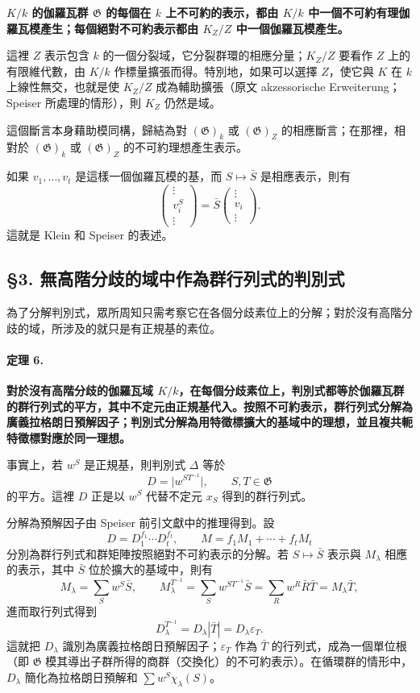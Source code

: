 \documentclass[11pt]{article}
\newcommand{\Gg}{\mathfrak G}
\newcommand{\srcemph}[1]{\textbf{#1}}
\begin{document}
\srcemph{\(K/k\) 的伽羅瓦群 \(\Gg\) 的每個在 \(k\) 上不可約的表示，都由 \(K/k\) 中一個不可約有理伽羅瓦模產生；每個絕對不可約表示都由 \(K_Z/Z\) 中一個伽羅瓦模產生。}

這裡 \(Z\) 表示包含 \(k\) 的一個分裂域，它分裂群環的相應分量；\(K_Z/Z\) 要看作 \(Z\) 上的有限維代數，由 \(K/k\) 作標量擴張而得。特別地，如果可以選擇 \(Z\)，使它與 \(K\) 在 \(k\) 上線性無交，也就是使 \(K_Z/Z\) 成為輔助擴張（原文 akzessorische Erweiterung；Speiser 所處理的情形），則 \(K_Z\) 仍然是域。

這個斷言本身藉助模同構，歸結為對 \((\Gg)_k\) 或 \((\Gg)_Z\) 的相應斷言；在那裡，相對於 \((\Gg)_k\) 或 \((\Gg)_Z\) 的不可約理想產生表示。

如果 \(v_1,\ldots,v_t\) 是這樣一個伽羅瓦模的基，而 \(S\mapsto \bar S\) 是相應表示，則有
\[
        \begin{pmatrix}\vdots\\ v_i^S\\ \vdots\end{pmatrix}
        =\bar S\begin{pmatrix}\vdots\\ v_i\\ \vdots\end{pmatrix}.
\]
這就是 Klein 和 Speiser 的表述。

\subsection*{§3. 無高階分歧的域中作為群行列式的判別式}

為了分解判別式，眾所周知只需考察它在各個分歧素位上的分解；對於沒有高階分歧的域，所涉及的就只是有正規基的素位。

\paragraph{定理 6.}
\srcemph{對於沒有高階分歧的伽羅瓦域 \(K/k\)，在每個分歧素位上，判別式都等於伽羅瓦群的群行列式的平方，其中不定元由正規基代入。按照不可約表示，群行列式分解為廣義拉格朗日預解因子；判別式分解為用特徵標擴大的基域中的理想，並且複共軛特徵標對應於同一理想。}

事實上，若 \(w^S\) 是正規基，則判別式 \(\Delta\) 等於
\[
        D=\bigl|w^{ST^{-1}}\bigr|,\qquad S,T\in\Gg
\]
的平方。這裡 \(D\) 正是以 \(w^S\) 代替不定元 \(x_S\) 得到的群行列式。

分解為預解因子由 Speiser 前引文獻中的推理得到。設
\[
        D=D_1^{f_1}\cdots D_t^{f_t},
        \qquad
        M=f_1M_1+\cdots+f_tM_t
\]
分別為群行列式和群矩陣按照絕對不可約表示的分解。若 \(S\mapsto\bar S\) 表示與 \(M_\lambda\) 相應的表示，其中 \(\bar S\) 位於擴大的基域中，則有
\[
        M_\lambda=\sum_S w^S\bar S,
        \qquad
        M_\lambda^{T^{-1}}=\sum_S w^{ST^{-1}}\bar S
          =\sum_R w^R\bar R\bar T=M_\lambda\bar T,
\]
進而取行列式得到
\[
        D_\lambda^{T^{-1}}=D_\lambda|\bar T|=D_\lambda\varepsilon_T.
\]
這就把 \(D_\lambda\) 識別為廣義拉格朗日預解因子；\(\varepsilon_T\) 作為 \(\bar T\) 的行列式，成為一個單位根（即 \(\Gg\) 模其導出子群所得的商群（交換化）的不可約表示）。在循環群的情形中，\(D_\lambda\) 簡化為拉格朗日預解和 \(\sum w^S\chi_\lambda(S)\)。
\end{document}
